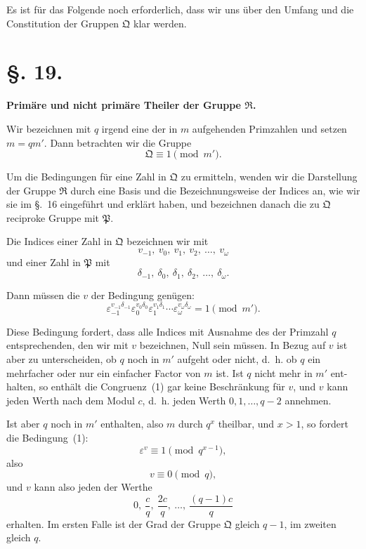 \documentclass[12pt,a4paper]{article}
\theoremstyle{plain}
\theoremstyle{definition}
\theoremstyle{remark}
\begin{document}
Es ist für das Folgende noch erforderlich, dass wir uns
über den Umfang und die Constitution der Gruppen $\mathfrak{Q}$ klar
werden.


\section*{\S. 19.}
\begin{center}
\textbf{Primäre und nicht primäre Theiler der Gruppe $\mathfrak{R}$.}
\end{center}

Wir bezeichnen mit $q$ irgend eine der in $m$ aufgehenden
Primzahlen und setzen $m = qm'$. Dann betrachten wir die
Gruppe
\[
\mathfrak{Q} \equiv 1 \pmod{m'}.
\]

Um die Bedingungen für eine Zahl in $\mathfrak{Q}$ zu ermitteln, wenden
wir die Darstellung der Gruppe $\mathfrak{R}$ durch eine Basis und die
Bezeichnungsweise der Indices an, wie wir sie im \S.~16 eingeführt
und erklärt haben, und bezeichnen danach die zu $\mathfrak{Q}$ reciproke
Gruppe mit $\mathfrak{P}$.

Die Indices einer Zahl in $\mathfrak{Q}$ bezeichnen wir mit
\[
v_{-1}, \ v_0, \ v_1, \ v_2, \ \ldots, \ v_\omega
\]
und einer Zahl in $\mathfrak{P}$ mit
\[
\delta_{-1}, \ \delta_0, \ \delta_1, \ \delta_2, \ \ldots, \ \delta_\omega.
\]

Dann müssen die $v$ der Bedingung genügen:
\begin{equation}\tag{1}
\varepsilon_{-1}^{v_{-1}\delta_{-1}} \varepsilon_0^{v_0\delta_0} \varepsilon_1^{v_1\delta_1} \cdots \varepsilon_\omega^{v_\omega\delta_\omega} = 1 \pmod{m'}.
\end{equation}

Diese Bedingung fordert, dass alle Indices mit Ausnahme
des der Primzahl $q$ entsprechenden, den wir mit $v$ bezeichnen,
Null sein müssen. In Bezug auf $v$ ist aber zu unterscheiden, ob
$q$ noch in $m'$ aufgeht oder nicht, d.~h. ob $q$ ein mehrfacher oder
nur ein einfacher Factor von $m$ ist. Ist $q$ nicht mehr in $m'$ ent-
halten, so enthält die Congruenz~(1) gar keine Beschränkung
für $v$, und $v$ kann jeden Werth nach dem Modul $c$, d.~h. jeden
Werth $0, 1, \ldots, q-2$ annehmen.

Ist aber $q$ noch in $m'$ enthalten, also $m$ durch $q^x$ theilbar,
und $x > 1$, so fordert die Bedingung~(1):
\[
\varepsilon^v \equiv 1 \pmod{q^{x-1}},
\]
also
\begin{equation}\tag{2}
v \equiv 0 \pmod{q},
\end{equation}
und $v$ kann also jeden der Werthe
\[
0, \ \frac{c}{q}, \ \frac{2c}{q}, \ \ldots, \ \frac{(q-1)c}{q}
\]
erhalten. Im ersten Falle ist der Grad der Gruppe $\mathfrak{Q}$ gleich $q-1$,
im zweiten gleich $q$.
\end{document}
